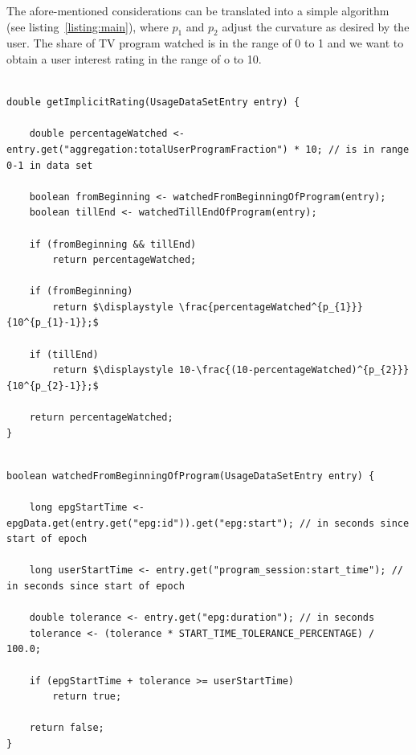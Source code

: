 \documentclass[parskip=full]{scrartcl}
\begin{document}
The afore-mentioned considerations can be translated into a simple algorithm (see listing~\ref{listing:main}), where \texttt{$p_{1}$} and \texttt{$p_{2}$} adjust the curvature as desired by the user. The share of TV program watched is in the range of 0 to 1 and we want to obtain a user interest rating in the range of o to 10.

\begin{lstlisting}[mathescape, breaklines=true,label=listing:main,caption=Main method for implicit user rating generation.]

double getImplicitRating(UsageDataSetEntry entry) {

	double percentageWatched <- entry.get("aggregation:totalUserProgramFraction") * 10; // is in range 0-1 in data set

	boolean fromBeginning <- watchedFromBeginningOfProgram(entry);
	boolean tillEnd <- watchedTillEndOfProgram(entry);

	if (fromBeginning && tillEnd)
		return percentageWatched;

	if (fromBeginning)
		return $\displaystyle \frac{percentageWatched^{p_{1}}}{10^{p_{1}-1}};$
	
	if (tillEnd)
		return $\displaystyle 10-\frac{(10-percentageWatched)^{p_{2}}}{10^{p_{2}-1}};$

	return percentageWatched;
}
\end{lstlisting}

\begin{lstlisting}[mathescape, breaklines=true,label=listing:watchedFromBeginningOfProgram,caption=Method watchedFromBeginningOfProgram.]

boolean watchedFromBeginningOfProgram(UsageDataSetEntry entry) {

	long epgStartTime <- epgData.get(entry.get("epg:id")).get("epg:start"); // in seconds since start of epoch
	
	long userStartTime <- entry.get("program_session:start_time"); // in seconds since start of epoch
	
	double tolerance <- entry.get("epg:duration"); // in seconds
	tolerance <- (tolerance * START_TIME_TOLERANCE_PERCENTAGE) / 100.0;
	
	if (epgStartTime + tolerance >= userStartTime)
		return true;

	return false;
}
\end{lstlisting}
\end{document}
